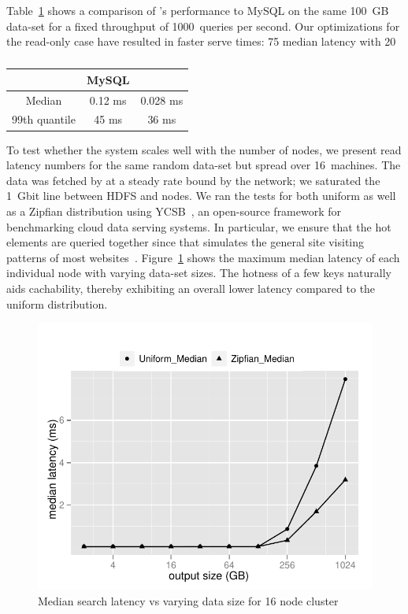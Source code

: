 Table~\ref{mysql:search} shows a comparison of \projectname's
performance to MySQL on the same 100~GB data-set for a fixed
throughput of 1000~queries per second. Our optimizations for the
read-only case have resulted in faster serve times: 75%
median latency with 20%

\begin{table}
\centering
\begin{tabular}{ | c | c | c |  }
\hline
                & MySQL   & \projectname{} \\ \hline
Median          & 0.12 ms & 0.028 ms       \\
99th quantile	& 45 ms   & 36 ms          \\
\hline
\end{tabular}
\caption{}
\label{mysql:search}
\end{table}

To test whether the system scales well with the number of nodes, we
present read latency numbers for the same random data-set but spread
over 16~machines. The data was fetched by \projectname{} at a steady
rate bound by the network; we saturated the 1~Gbit line between HDFS
and \projectname{} nodes. We ran the tests for both uniform as well as
a Zipfian distribution using YCSB~\cite{ycsb}, an open-source framework 
for benchmarking cloud data serving systems. In particular,
 we ensure that the hot elements are queried together since that 
simulates the general site visiting patterns of most websites~\cite{...}.
Figure~\ref{16search} shows the maximum median latency of each
individual node with varying data-set sizes. The hotness of a few keys
naturally aids cachability, thereby exhibiting an overall lower
latency compared to the uniform distribution. 

\begin{figure}
  \centering
    \includegraphics[scale=0.55]{images/search_16node.pdf}
  \caption{Median search latency vs varying data size for 16 node cluster}
  \label{16search}
\end{figure}

